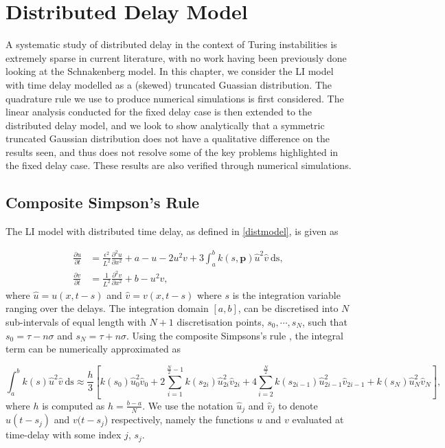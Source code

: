 \chapter{Distributed Delay Model}\label{section:distdel}

A systematic study of distributed delay in the context of Turing instabilities is extremely sparse in current literature, with no work having been previously done looking at the Schnakenberg model. In this chapter, we consider the LI model with time delay modelled as a (skewed) truncated Guassian distribution. The quadrature rule we use to produce numerical simulations is first considered. The linear analysis conducted for the fixed delay case is then extended to the distributed delay model, and we look to show analytically that a symmetric truncated Gaussian distribution does not have a qualitative difference on the results seen, and thus does not resolve some of the key problems highlighted in the fixed delay case. These results are also verified through numerical simulations.

\section{Composite Simpson's Rule}\label{section:quad}

The LI model with distributed time delay, as defined in \eqref{distmodel}, is given as

\begin{equation}\label{distmodel2}
  \begin{split}
    \frac{\partial u}{\partial t}&=\frac{\epsilon^2}{L^2}\frac{\partial^2u}{\partial x^2}+a-u-2u^2v+3\int_{a}^{b}k(s,\textbf{p})\hat{u}^2\hat{v} \ \text{ds},\\
    \frac{\partial v}{\partial t}&=\frac{1}{L^2}\frac{\partial^2v}{\partial x^2}+b-u^2v,
\end{split}
\end{equation}
where $\hat{u}=u(x,t-s)$ and $\hat{v}=v(x,t-s)$ where $s$ is the integration variable ranging over the delays. The integration domain $[a, b]$, can be discretised into $N$ sub-intervals of equal length with $N+1$ discretisation points, $s_0,\cdots,s_{N}$, such that $s_0=\tau-n\sigma$ and $s_N=\tau+n\sigma$. Using the composite Simpsons's rule \cite{compsimp}, the integral term can be numerically approximated as

\begin{equation}\label{simp}\int_{a}^{b}k(s)\hat{u}^2\hat{v}\  \text{ds}\approx\frac{h}{3}\left[k(s_0)\hat{u}^2_0\hat{v}_0+2\sum_{i=1}^{\frac{N}{2}-1}k(s_{2i})\hat{u}^2_{2i}\hat{v}_{2i}+4\sum_{i=2}^{\frac{N}{2}}k(s_{2i-1})\hat{u}^2_{2i-1}\hat{v}_{2i-1}+k(s_N)\hat{u}^2_N\hat{v}_N\right],
\end{equation}
where $h$ is computed as $h=\frac{b-a}{N}$. We use the notation $\hat{u}_j$ and $\hat{v}_j$ to denote $u(t-s_j)$ and $v(t-s_j$) respectively, namely the functions $u$ and $v$ evaluated at time-delay with some index $j$, $s_j$.

